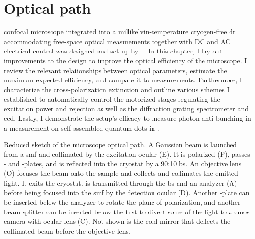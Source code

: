 \chapter{Optical path}\label{ch:setup:optics}
 confocal microscope integrated into a millikelvin-temperature cryogen-free \gls{dr} accommodating free-space optical measurements together with DC and AC electrical control was designed and set up by \citeauthor{Descamps2024}~\cite{Descamps2021,Descamps2024}.
In this chapter, I lay out improvements to the design to improve the optical efficiency of the microscope.
I review the relevant relationships between optical parameters, estimate the maximum expected efficiency, and compare it to measurements.
Furthermore, I characterize the cross-polarization extinction and outline various schemes I established to automatically control the motorized stages regulating the excitation power and rejection as well as the diffraction grating spectrometer and \gls{ccd}.
Lastly, I demonstrate the setup's efficacy to measure photon anti-bunching in a  measurement on self-assembled quantum dots in .

\begin{marginfigure}[*-9]
    
    \caption[]{
        Reduced sketch of the microscope optical path.
        A Gaussian beam is launched from a \gls{smf} and collimated by the excitation ocular (E).
        It is polarized (P), passes \halfwave- and \quarterwave-plates, and is reflected into the cryostat by a 90:10 \acrfull{bs}.
        An objective lens (O) focuses the beam onto the sample and collects and collimates the emitted light.
        It exits the cryostat, is transmitted through the \gls{bs} and an analyzer (A) before being focused into the \gls{smf} by the detection ocular (D).
        Another \halfwave-plate can be inserted below the analyzer to rotate the plane of polarization, and another beam splitter can be inserted below the first to divert some of the light to a \gls{cmos} camera with ocular lens (C).
        Not shown is the cold mirror that deflects the collimated beam before the objective lens.
    }
    \label{fig:setup:optics:optical_path}
\end{marginfigure}

